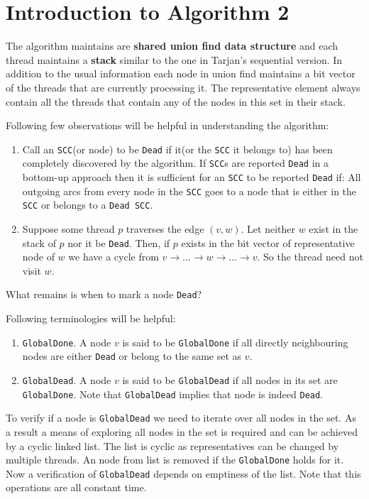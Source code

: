 \documentclass[a4paper]{article}
\begin{document}
\section{Introduction to Algorithm 2}
\label{sec:intro2}

The algorithm maintains are \textbf{shared union find data structure} and each thread maintains a \textbf{stack} similar to the one in Tarjan's sequential version.
In addition to the usual information each node in union find maintains a bit vector of the threads that are currently processing it. The representative element always contain all the threads that contain any of the nodes in this set in their stack.

Following few observations will be helpful in understanding the algorithm:
\begin{enumerate}
    \item Call an \texttt{SCC}(or node) to be \texttt{Dead} if it(or the \texttt{SCC} it belongs to) has been completely discovered by the algorithm.
    If \texttt{SCC}s are reported \texttt{Dead} in a bottom-up approach then it is sufficient for an \texttt{SCC} to be reported \texttt{Dead} if: All outgoing arcs from every node in the \texttt{SCC} goes to a node that is either in the \texttt{SCC} or belongs to a \texttt{Dead SCC}.
    \item Suppose some thread $p$ traverses the edge $(v, w)$. Let neither $w$ exist in the stack of $p$ nor it be \texttt{Dead}. Then, if $p$ exists in the bit vector of representative node of $w$ we have a cycle from $v \rightarrow \dots \rightarrow w \rightarrow \dots \rightarrow v$. So the thread need not visit $w$.  
\end{enumerate}

What remains is when to mark a node \texttt{Dead}?

Following terminologies will be helpful:
\begin{enumerate}
    \item \texttt{GlobalDone}. A node $v$ is said to be \texttt{GlobalDone} if all directly neighbouring nodes are either \texttt{Dead} or belong to the same set as $v$.
    \item \texttt{GlobalDead}. A node $v$ is said to be \texttt{GlobalDead} if all nodes in its set are \texttt{GlobalDone}. Note that \texttt{GlobalDead} implies that node is indeed \texttt{Dead}.
\end{enumerate}

To verify if a node is \texttt{GlobalDead} we need to iterate over all nodes in the set.
As a result a means of exploring all nodes in the set is required and can be achieved by a cyclic linked list. The list is cyclic as representatives can be changed by multiple threads.
An node from list is removed if the \texttt{GlobalDone} holds for it. Now a verification of \texttt{GlobalDead} depends on emptiness of the list. Note that this operations are all constant time.
\end{document}

